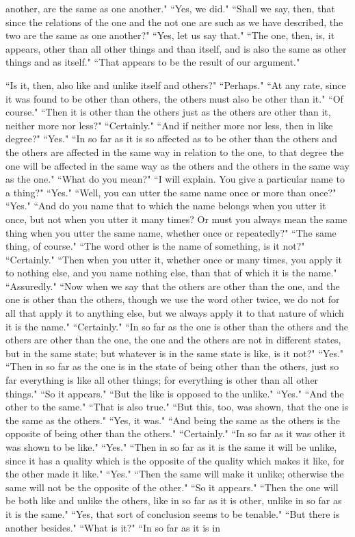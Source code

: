 \documentclass[letterpaper,12pt]{article}
\newcommand{\stephpag}[1]{\marginnote{\small\itshape\fontfamily{ppl}\selectfont #1}}
\begin{document}
another, are the same as one another." ``Yes, we did." ``Shall we say, then, that since the relations of the one and the not one are such as we have described, the two are the same as one another?" ``Yes, let us say that." ``The one, then, is, it appears, other than all other things and than itself, and is also the same as other things and as itself." \stephpag{c} ``That appears to be the result of our argument."

``Is it, then, also like and unlike itself and others?" ``Perhaps." ``At any rate, since it was found to be other than others, the others must also be other than it." ``Of course." ``Then it is other than the others just as the others are other than it, neither more nor less?" ``Certainly." ``And if neither more nor less, then in like degree?" ``Yes." ``In so far as it is so affected as to be other than the others and the others are affected in the same way in relation to the one, to that degree the one will be affected \stephpag{d} in the same way as the others and the others in the same way as the one." ``What do you mean?" ``I will explain. You give a particular name to a thing?" ``Yes." ``Well, you can utter the same name once or more than once?" ``Yes." ``And do you name that to which the name belongs when you utter it once, but not when you utter it many times? Or must you always mean the same thing when you utter the same name, whether once or repeatedly?" ``The same thing, of course." ``The word other is the name of something, is it not?" ``Certainly." \stephpag{e} ``Then when you utter it, whether once or many times, you apply it to nothing else, and you name nothing else, than that of which it is the name." ``Assuredly." ``Now when we say that the others are other than the one, and the one is other than the others, though we use the word other twice, we do not for all that apply it to anything else, but we always apply it to that nature of which it is the name." ``Certainly." \stephpag{148 a} ``In so far as the one is other than the others and the others are other than the one, the one and the others are not in different states, but in the same state; but whatever is in the same state is like, is it not?" ``Yes." ``Then in so far as the one is in the state of being other than the others, just so far everything is like all other things; for everything is other than all other things." ``So it appears." ``But the like is opposed to the unlike." ``Yes." ``And the other to the same." ``That is also true." ``But this, too, was shown, that the one is the same as the others." \stephpag{b} ``Yes, it was." ``And being the same as the others is the opposite of being other than the others." ``Certainly." ``In so far as it was other it was shown to be like." ``Yes." ``Then in so far as it is the same it will be unlike, since it has a quality which is the opposite of the quality which makes it like, for the other made it like." ``Yes." ``Then the same will make it unlike; otherwise the same will not be the opposite of the other." \stephpag{c} ``So it appears." ``Then the one will be both like and unlike the others, like in so far as it is other, unlike in so far as it is the same." ``Yes, that sort of conclusion seems to be tenable." ``But there is another besides." ``What is it?" ``In so far as it is in 
\end{document}
